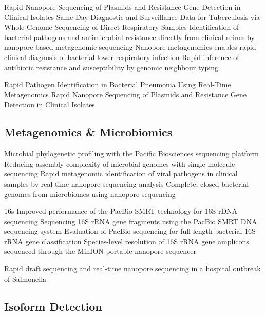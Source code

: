 Rapid Nanopore Sequencing of Plasmids and Resistance Gene Detection in Clinical Isolates \cite{Lemon2017}
Same-Day Diagnostic and Surveillance Data for Tuberculosis via Whole-Genome Sequencing of Direct Respiratory Samples \cite{Votintseva2017}
Identification of bacterial pathogens and antimicrobial resistance directly from clinical urines by nanopore-based metagenomic sequencing \cite{Schmidt2017}
Nanopore metagenomics enables rapid clinical diagnosis of bacterial lower respiratory infection \cite{Charalampous2019}
Rapid inference of antibiotic resistance and susceptibility by genomic neighbour typing \cite{Brinda2020}

Rapid Pathogen Identification in Bacterial Pneumonia Using Real-Time Metagenomics \cite{Pendleton2017}
Rapid Nanopore Sequencing of Plasmids and Resistance Gene Detection in Clinical Isolates \cite{Lemon2017}




\subsection{Metagenomics \& Microbiomics}
\label{subsec:state_of_art:metagenomics}

Microbial phylogenetic profiling with the Pacific Biosciences sequencing platform \cite{Fichot2013}
Reducing assembly complexity of microbial genomes with single-molecule sequencing \cite{Koren2013}
Rapid metagenomic identification of viral pathogens in clinical samples by real-time nanopore sequencing analysis \cite{Greninger2015}
Complete, closed bacterial genomes from microbiomes using nanopore sequencing \cite{Moss2020}

16s
Improved performance of the PacBio SMRT technology for 16S rDNA sequencing \cite{Mosher2014}
Sequencing 16S rRNA gene fragments using the PacBio SMRT DNA sequencing system \cite{Schloss2016}
Evaluation of PacBio sequencing for full-length bacterial 16S rRNA gene classification \cite{Wagner2016}
Species-level resolution of 16S rRNA gene amplicons sequenced through the MinION portable nanopore sequencer \cite{Benitez-Paez2016}

Rapid draft sequencing and real-time nanopore sequencing in a hospital outbreak of Salmonella \cite{Quick2015}





\subsection{Isoform Detection}
\label{subsec:state_of_art:isoform}

